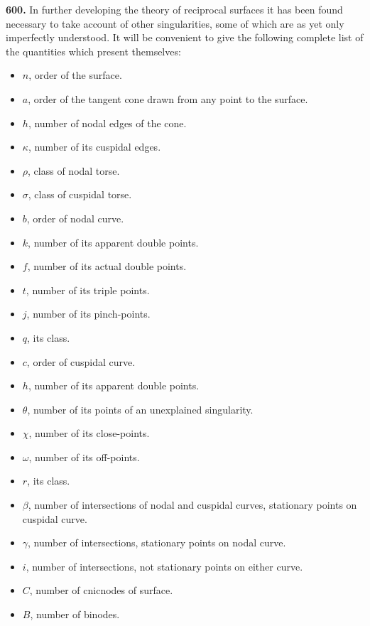 \documentclass[11pt]{article}
\newcommand{\artno}[1]{\textbf{#1.}\quad}
\begin{document}
\medskip
\noindent
\artno{600} In further developing the theory of reciprocal surfaces it has
been found necessary to take account of other singularities, some of which
are as yet only imperfectly understood. It will be convenient to give the
following complete list of the quantities which present themselves:

\medskip
\begin{itemize}
\setlength{\itemsep}{1pt}
\item[] $n$, order of the surface.
\item[] $a$, order of the tangent cone drawn from any point to the surface.
\item[] $h$, number of nodal edges of the cone.
\item[] $\kappa$, number of its cuspidal edges.
\item[] $\rho$, class of nodal torse.
\item[] $\sigma$, class of cuspidal torse.
\item[] $b$, order of nodal curve.
\item[] $k$, number of its apparent double points.
\item[] $f$, number of its actual double points.
\item[] $t$, number of its triple points.
\item[] $j$, number of its pinch-points.
\item[] $q$, its class.
\item[] $c$, order of cuspidal curve.
\item[] $h$, number of its apparent double points.
\item[] $\theta$, number of its points of an unexplained singularity.
\item[] $\chi$, number of its close-points.
\end{itemize}

\bigskip
\begin{itemize}
\setlength{\itemsep}{1pt}
\item[] $\omega$, number of its off-points.
\item[] $r$, its class.
\item[] $\beta$, number of intersections of nodal and cuspidal curves,
   stationary points on cuspidal curve.
\item[] $\gamma$, number of intersections, stationary points on nodal curve.
\item[] $i$, number of intersections, not stationary points on either curve.
\item[] $C$, number of cnicnodes of surface.
\item[] $B$, number of binodes.
\end{itemize}
\end{document}
